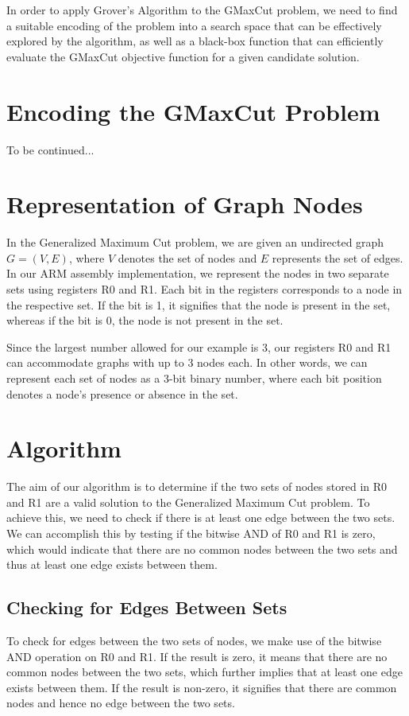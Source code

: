 In order to apply Grover's Algorithm to the GMaxCut problem, we need to find a suitable encoding of the problem into a search space that can be effectively explored by the algorithm, as well as a black-box function that can efficiently evaluate the GMaxCut objective function for a given candidate solution.

\section{Encoding the GMaxCut Problem}

To be continued...


\section{Representation of Graph Nodes}
In the Generalized Maximum Cut problem, we are given an undirected graph $G = (V, E)$, where $V$ denotes the set of nodes and $E$ represents the set of edges. In our ARM assembly implementation, we represent the nodes in two separate sets using registers R0 and R1. Each bit in the registers corresponds to a node in the respective set. If the bit is 1, it signifies that the node is present in the set, whereas if the bit is 0, the node is not present in the set.

Since the largest number allowed for our example is 3, our registers R0 and R1 can accommodate graphs with up to 3 nodes each. In other words, we can represent each set of nodes as a 3-bit binary number, where each bit position denotes a node's presence or absence in the set.

\section{Algorithm}
The aim of our algorithm is to determine if the two sets of nodes stored in R0 and R1 are a valid solution to the Generalized Maximum Cut problem. To achieve this, we need to check if there is at least one edge between the two sets. We can accomplish this by testing if the bitwise AND of R0 and R1 is zero, which would indicate that there are no common nodes between the two sets and thus at least one edge exists between them.

\subsection{Checking for Edges Between Sets}
To check for edges between the two sets of nodes, we make use of the bitwise AND operation on R0 and R1. If the result is zero, it means that there are no common nodes between the two sets, which further implies that at least one edge exists between them. If the result is non-zero, it signifies that there are common nodes and hence no edge between the two sets.

